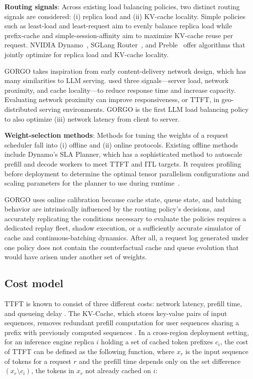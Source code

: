 \documentclass{article}
\begin{document}
\textbf{Routing signals}: Across existing load balancing policies, two distinct routing signals are considered: (i) replica load and (ii) KV-cache locality.
Simple policies such as least-load and least-request aim to evenly balance replica load while prefix-cache and simple-session-affinity aim to maximize KV-cache reuse per request.
NVIDIA Dynamo~\citep{nvidiaDynamoRouter}, SGLang Router~\citep{sglang2024}, and Preble~\citep{preble} offer algorithms that jointly optimize for replica load and KV-cache locality.

GORGO takes inspiration from early content-delivery network design, which has many similarities to LLM serving.
\citet{wang2002cdn} used three signals---server load, network proximity, and cache locality---to reduce response time and increase capacity. Evaluating network proximity can improve
responsiveness, or TTFT, in geo-distributed serving environments. GORGO is the first LLM load balancing policy to also optimize (iii) network latency from client to server.

\textbf{Weight-selection methods}: Methods for tuning the weights of a request scheduler fall into (i) offline and (ii) online protocols.
Existing offline methods include Dynamo's SLA Planner, which has a sophisticated method to autoscale prefill and decode workers to meet TTFT and ITL targets.
It requires profiling before deployment to determine the optimal tensor parallelism configurations and scaling parameters for the planner to use during runtime~\citep{nvidiaDynamoPlanner}.

GORGO uses online calibration because cache state, queue state, and batching behavior are intrinsically influenced by the routing policy's decisions, and accurately replicating the conditions necessary to evaluate the policies requires a dedicated replay fleet, shadow execution, or a sufficiently accurate simulator of cache and continuous-batching dynamics.
After all, a request log generated under one policy does not contain the counterfactual cache and queue evolution that would have arisen under another set of weights.

\subsection{Cost model}

TTFT is known to consist of three different costs: network latency, prefill time, and queueing delay \citep{banaserve2025}. The KV-Cache, which stores key-value pairs of input sequences, removes redundant prefill computation for user sequences sharing a prefix with previously computed sequences \citep{sglang2024}. In a cross-region deployment setting, for an inference engine replica $i$ holding a set of cached token prefixes $c_i$, the cost of TTFT can be defined as the following function, where $x_r$ is the input sequence of tokens for a request $r$ and the prefill time depends only on the set difference $(x_r \setminus c_i)$, the tokens in $x_r$ not already cached on $i$:
\end{document}
